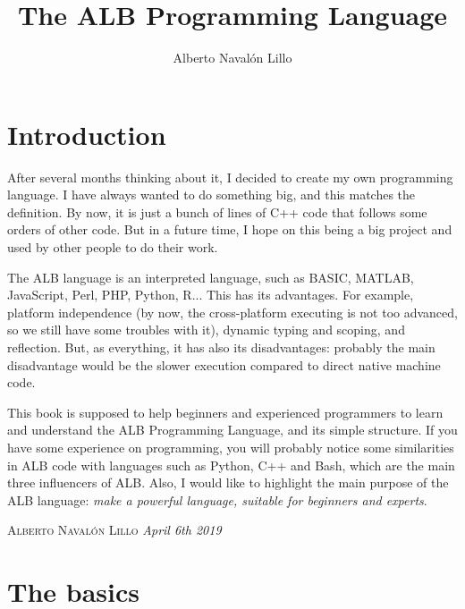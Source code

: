 \documentclass[12pt]{book}
\title{The ALB Programming Language}
\author{Alberto Navalón Lillo}
\begin{document}
\frontmatter
\maketitle
\tableofcontents
\mainmatter


\chapter*{Introduction}
After several months thinking about it, I decided to create my own programming language. I have always wanted to do something big, and this matches the definition. By now, it is just a bunch of lines of C++ code that follows some orders of other code. But in a future time, I hope on this being a big project and used by other people to do their work.\\
\bigskip

The ALB language is an interpreted language, such as BASIC, MATLAB, JavaScript, Perl, PHP, Python, R... This has its advantages. For example, platform independence (by now, the cross-platform executing is not too advanced, so we still have some troubles with it), dynamic typing and scoping, and reflection. But, as everything, it has also its disadvantages: probably the main disadvantage would be the slower execution compared to direct native machine code.\\
\bigskip

This book is supposed to help beginners and experienced programmers to learn and understand the ALB Programming Language, and its simple structure. If you have some experience on programming, you will probably notice some similarities in ALB code with languages such as Python, C++ and Bash, which are the main three influencers of ALB. Also, I would like to highlight the main purpose of the ALB language: \textit{make a powerful language, suitable for beginners and experts}.\\
\bigskip

\begin{flushright}
\textsc{Alberto Navalón Lillo}\newline
\textit{April 6th 2019}
\end{flushright}
\chapter[The basics]{\centering The basics}
\end{document}
